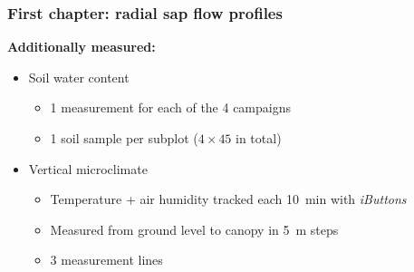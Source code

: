 \documentclass[usepdftitle=false]{beamer}
\newcommand{\Blue}[1]{{\color{blue!50!black}\textbf{#1}}}
\begin{document}
\begin{frame}
	\frametitle{First chapter: radial sap flow profiles}
  \Blue{Additionally measured:}
  \begin{itemize}
  	\item \alert{Soil water content}
  	\begin{itemize}
  		\item 1 measurement for each of the 4 campaigns
  		\item 1 soil sample per subplot ($4\times45$ in total)
  	\end{itemize}
  	\item \alert{Vertical microclimate}
  	\begin{itemize}
  		\item Temperature + air humidity tracked each 10~min with \textit{iButtons}
  		\item Measured from ground level to canopy in 5~m steps
  		\item 3 measurement lines
  	\end{itemize}
  \end{itemize}
\end{frame}
\end{document}

